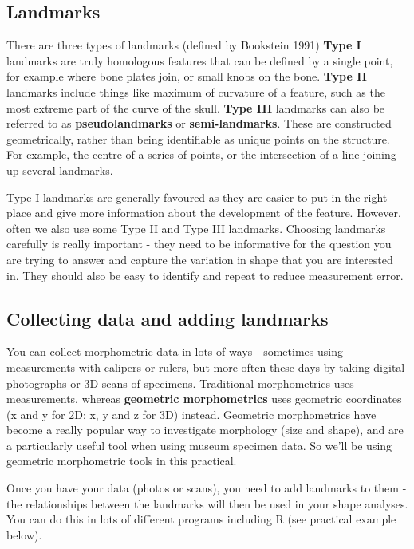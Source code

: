 \documentclass[]{book}
\theoremstyle{definition}
\theoremstyle{definition}
\theoremstyle{definition}
\theoremstyle{remark}
\begin{document}
\subsection{Landmarks}\label{landmarks}

There are three types of landmarks (defined by Bookstein 1991)
\textbf{Type I} landmarks are truly homologous features that can be
defined by a single point, for example where bone plates join, or small
knobs on the bone. \textbf{Type II} landmarks include things like
maximum of curvature of a feature, such as the most extreme part of the
curve of the skull. \textbf{Type III} landmarks can also be referred to
as \textbf{pseudolandmarks} or \textbf{semi-landmarks}. These are
constructed geometrically, rather than being identifiable as unique
points on the structure. For example, the centre of a series of points,
or the intersection of a line joining up several landmarks.

Type I landmarks are generally favoured as they are easier to put in the
right place and give more information about the development of the
feature. However, often we also use some Type II and Type III landmarks.
Choosing landmarks carefully is really important - they need to be
informative for the question you are trying to answer and capture the
variation in shape that you are interested in. They should also be easy
to identify and repeat to reduce measurement error.

\subsection{Collecting data and adding
landmarks}\label{collecting-data-and-adding-landmarks}

You can collect morphometric data in lots of ways - sometimes using
measurements with calipers or rulers, but more often these days by
taking digital photographs or 3D scans of specimens. Traditional
morphometrics uses measurements, whereas \textbf{geometric
morphometrics} uses geometric coordinates (x and y for 2D; x, y and z
for 3D) instead. Geometric morphometrics have become a really popular
way to investigate morphology (size and shape), and are a particularly
useful tool when using museum specimen data. So we'll be using geometric
morphometric tools in this practical.

Once you have your data (photos or scans), you need to add landmarks to
them - the relationships between the landmarks will then be used in your
shape analyses. You can do this in lots of different programs including
R (see practical example below).
\end{document}
